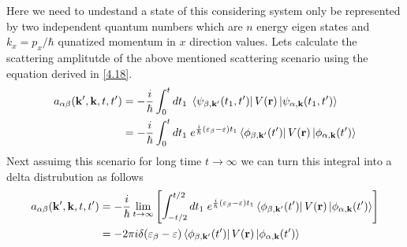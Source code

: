 \noindent
Here we need to undestand a state of this considering system only be represented by two independent quantum numbers which are $n$ energy eigen
states and $k_x = p_x/\hbar$ qunatized momentum in $x$ direction values. Lets calculate the scattering amplitutde of the above mentioned scattering scenario using the equation derived in \eqref{4.18}.
\begin{equation} \label{4.21}
  \begin{aligned}
    a_{\alpha\beta}(\mathbf{k'},\mathbf{k},t,t') & =
    -
    \frac{i}{\hbar}
    \int_{0}^t dt_1 \;
    \bra{\psi_{\beta,\mathbf{k'}}(t_1,t')}
    V(\mathbf{r}) \ket{\psi_{\alpha,\mathbf{k}}(t_1,t')} \\
    & =
    -
    \frac{i}{\hbar}
    \int_{0}^t dt_1 \;
    e^{\frac{i}{\hbar}\qty(\varepsilon_{\beta} - \varepsilon)t_1}
    \bra{\phi_{\beta,\mathbf{k'}}(t')}
    V(\mathbf{r}) \ket{\phi_{\alpha,\mathbf{k}}(t')}
  \end{aligned}
\end{equation}
Next assuimg this scenario for long time $t \rightarrow \infty$ we can turn this integral into a delta distrubution as follows
\begin{equation} \label{4.22}
  \begin{aligned}
    a_{\alpha\beta}(\mathbf{k'},\mathbf{k},t,t') & =
    -
    \frac{i}{\hbar}
    \lim_{t \rightarrow \infty}\qty[
      \int_{-t/2}^{t/2} dt_1 \;
      e^{\frac{i}{\hbar}\qty(\varepsilon_{\beta} - \varepsilon)t_1}
      \bra{\phi_{\beta,\mathbf{k'}}(t')}
      V(\mathbf{r}) \ket{\phi_{\alpha,\mathbf{k}}(t')}
    ] \\
    & =
    -2\pi i \delta(\varepsilon_{\beta} - \varepsilon)
    \bra{\phi_{\beta,\mathbf{k'}}(t')}
    V(\mathbf{r}) \ket{\phi_{\alpha,\mathbf{k}}(t')}
  \end{aligned}
\end{equation}

